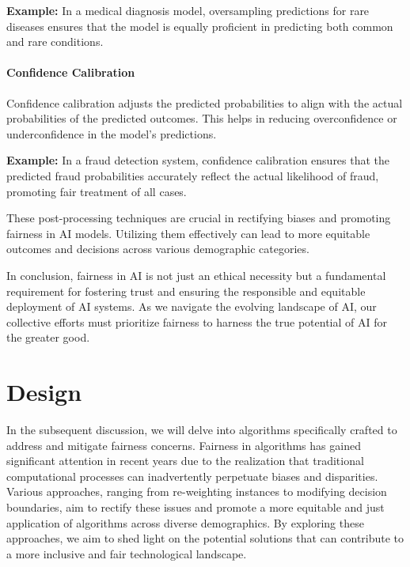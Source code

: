\documentclass[12pt,a4paper,openright,twoside]{book}
\begin{document}
\textbf{Example:} In a medical diagnosis model, oversampling predictions for rare diseases ensures that the model is equally proficient in predicting both common and rare conditions.

\subsubsection{Confidence Calibration}
Confidence calibration adjusts the predicted probabilities to align with the actual probabilities of the predicted outcomes. This helps in reducing overconfidence or underconfidence in the model's predictions.

\textbf{Example:} In a fraud detection system, confidence calibration ensures that the predicted fraud probabilities accurately reflect the actual likelihood of fraud, promoting fair treatment of all cases.

These post-processing techniques are crucial in rectifying biases and promoting fairness in AI models. Utilizing them effectively can lead to more equitable outcomes and decisions across various demographic categories.


In conclusion, fairness in AI is not just an ethical necessity but a fundamental requirement for fostering trust and ensuring the responsible and equitable deployment of AI systems. As we navigate the evolving landscape of AI, our collective efforts must prioritize fairness to harness the true potential of AI for the greater good.


%

\chapter{Design} %
\label{chap:design}
In the subsequent discussion, we will delve into algorithms specifically crafted to address and mitigate fairness concerns. Fairness in algorithms has gained significant attention in recent years due to the realization that traditional computational processes can inadvertently perpetuate biases and disparities. Various approaches, ranging from re-weighting instances to modifying decision boundaries, aim to rectify these issues and promote a more equitable and just application of algorithms across diverse demographics. By exploring these approaches, we aim to shed light on the potential solutions that can contribute to a more inclusive and fair technological landscape.
\end{document}
